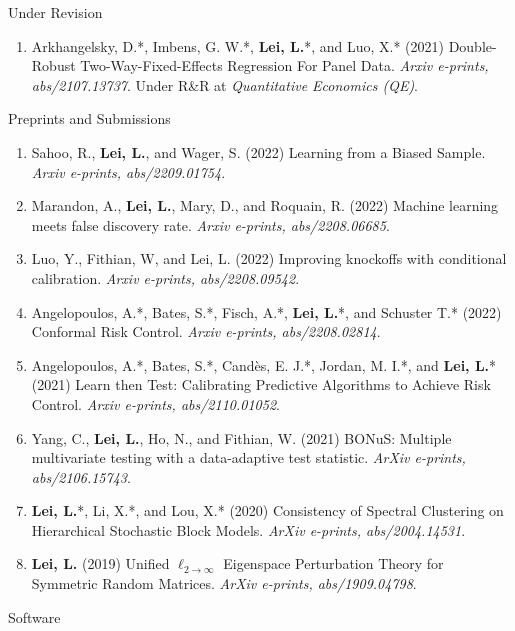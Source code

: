 \documentclass{article}
\begin{document}
\begin{large}
\noindent Under Revision
\end{large}

\begin{enumerate}
\item Arkhangelsky, D.*, Imbens, G. W.*, \textbf{Lei, L.}*, and Luo, X.* (2021) Double-Robust Two-Way-Fixed-Effects Regression For Panel Data. \emph{Arxiv e-prints, abs/2107.13737}. Under R\&R at \emph{Quantitative Economics (QE)}.
\end{enumerate}

\begin{large}
\noindent Preprints and Submissions
\end{large}

\begin{enumerate}
\item Sahoo, R., \textbf{Lei, L.}, and Wager, S. (2022) Learning from a Biased Sample. \emph{Arxiv e-prints, abs/2209.01754}.
\item Marandon, A., \textbf{Lei, L.}, Mary, D., and Roquain, R. (2022) Machine learning meets false discovery rate. \emph{Arxiv e-prints, abs/2208.06685}.
\item Luo, Y., Fithian, W, and Lei, L. (2022) Improving knockoffs with conditional calibration. \emph{Arxiv e-prints, abs/2208.09542}.
\item Angelopoulos, A.*, Bates, S.*, Fisch, A.*, \textbf{Lei, L.}*, and Schuster T.* (2022) Conformal Risk Control. \emph{Arxiv e-prints, abs/2208.02814}.
\item Angelopoulos, A.*, Bates, S.*, Cand\`{e}s, E. J.*, Jordan, M. I.*, and \textbf{Lei, L.}* (2021) Learn then Test: Calibrating Predictive Algorithms to Achieve Risk Control. \emph{Arxiv e-prints, abs/2110.01052}.
\item Yang, C., \textbf{Lei, L.}, Ho, N., and Fithian, W. (2021) BONuS: Multiple multivariate testing with a data-adaptive test statistic. \emph{ArXiv e-prints, abs/2106.15743}.
\item \textbf{Lei, L.}*, Li, X.*, and Lou, X.* (2020) Consistency of Spectral Clustering on Hierarchical Stochastic Block Models. \emph{ArXiv e-prints, abs/2004.14531}.
\item \textbf{Lei, L.} (2019) Unified $\ell_{2\rightarrow\infty}$ Eigenspace Perturbation Theory for Symmetric Random Matrices. \emph{ArXiv e-prints, abs/1909.04798}.
\end{enumerate}

\begin{large}
\noindent Software
\end{large}
\end{document}
